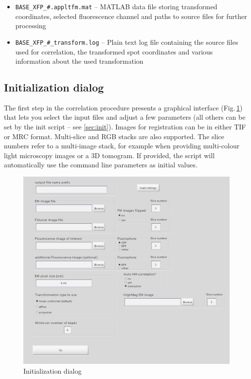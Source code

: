 \documentclass[10pt,a4paper,onepage,DIV12]{scrartcl}
\begin{document}
\begin{itemize}
\item \texttt{BASE\_XFP\_\#.appltfm.mat} -- MATLAB data file storing transformed coordinates, selected fluorescence channel and paths to source files for further processing
\item \texttt{BASE\_XFP\_\#\_transform.log} -- Plain text log file containing the source files used for correlation, the transformed spot coordinates and various information about the used transformation
\end{itemize}

\newpage
\subsection{Initialization dialog}
The first step in the correlation procedure presents a graphical interface (Fig.\,\ref{fig:init-gui}) that lets you select the input files and adjust a few parameters (all others can be set by the init script -- see \ref{sec:init}). Images for registration can be in either TIF or MRC format. Multi-slice and RGB stacks are also supported.  The slice numbers refer to a multi-image stack, for example when providing multi-colour light microscopy images or a 3D tomogram. If provided, the script will automatically use the command line parameters as initial values. 
\begin{figure}
 \centering
 \includegraphics[scale=0.5]{images/corr_gui}
 \caption{Initialization dialog}
 \label{fig:init-gui}
\end{figure}
\end{document}
